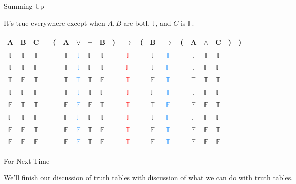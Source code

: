 \documentclass[
  ignorenonframetext,
]{beamer}
\renewcommand{\,}{\text{, }}
\def\True{\mathbb{T}}
\def\False{\mathbb{F}}
\begin{document}
\begin{frame}{Summing Up}
\protect\hypertarget{summing-up}{}

It's true everywhere except when \(A, B\) are both \(\True\), and \(C\)
is \(\False\).

\begin{center}
\bigskip
\begin{tabular}{@{ }c@{ }@{ }c@{ }@{ }c | c@{ }@{}c@{}@{ }c@{ }@{ }c@{ }@{ }c@{ }@{ }c@{ }@{}c@{}@{ }c@{ }@{}c@{}@{ }c@{ }@{ }c@{ }@{}c@{}@{ }c@{ }@{ }c@{ }@{ }c@{ }@{}c@{}@{}c@{}@{ }c}
A & B & C &  & ( & A & $\vee$ & $\neg$ & B & ) & $\rightarrow$ & ( & B & $\rightarrow$ & ( & A & $\wedge$ & C & ) & ) & \\
\hline 
 $\True$ & $\True$ & $\True$ &  &  & $\True$ & \textcolor{dodgerblue}{$\True$} & $\False$ & $\True$ &  &\textcolor{red}{$\True$}&  & $\True$ & \textcolor{dodgerblue}{$\True$} &  & $\True$ & $\True$ & $\True$ &  &  & \\
 $\True$ & $\True$ & $\False$ &  &  & $\True$ & \textcolor{dodgerblue}{$\True$} & $\False$ & $\True$ &  &\textcolor{red}{$\False$}&  & $\True$ & \textcolor{dodgerblue}{$\False$} &  & $\True$ & $\False$ & $\False$ &  &  & \\
 $\True$ & $\False$ & $\True$ &  &  & $\True$ & \textcolor{dodgerblue}{$\True$} & $\True$ & $\False$ &  &\textcolor{red}{$\True$}&  & $\False$ & \textcolor{dodgerblue}{$\True$} &  & $\True$ & $\True$ & $\True$ &  &  & \\
 $\True$ & $\False$ & $\False$ &  &  & $\True$ & \textcolor{dodgerblue}{$\True$} & $\True$ & $\False$ &  &\textcolor{red}{$\True$}&  & $\False$ & \textcolor{dodgerblue}{$\True$} &  & $\True$ & $\False$ & $\False$ &  &  & \\
 $\False$ & $\True$ & $\True$ &  &  & $\False$ & \textcolor{dodgerblue}{$\False$} & $\False$ & $\True$ &  &\textcolor{red}{$\True$}&  & $\True$ & \textcolor{dodgerblue}{$\False$} &  & $\False$ & $\False$ & $\True$ &  &  & \\
 $\False$ & $\True$ & $\False$ &  &  & $\False$ & \textcolor{dodgerblue}{$\False$} & $\False$ & $\True$ &  &\textcolor{red}{$\True$}&  & $\True$ & \textcolor{dodgerblue}{$\False$} &  & $\False$ & $\False$ & $\False$ &  &  & \\
 $\False$ & $\False$ & $\True$ &  &  & $\False$ & \textcolor{dodgerblue}{$\False$} & $\True$ & $\False$ &  &\textcolor{red}{$\True$}&  & $\False$ & \textcolor{dodgerblue}{$\True$} &  & $\False$ & $\False$ & $\True$ &  &  & \\
 $\False$ & $\False$ & $\False$ &  &  & $\False$ & \textcolor{dodgerblue}{$\False$} & $\True$ & $\False$ &  &\textcolor{red}{$\True$}&  & $\False$ & \textcolor{dodgerblue}{$\True$} &  & $\False$ & $\False$ & $\False$ &  &  & \\
\end{tabular}
\bigskip
\end{center}

\end{frame}

\begin{frame}{For Next Time}
\protect\hypertarget{for-next-time}{}

We'll finish our discussion of truth tables with discussion of what we
can do with truth tables.

\end{frame}
\end{document}
